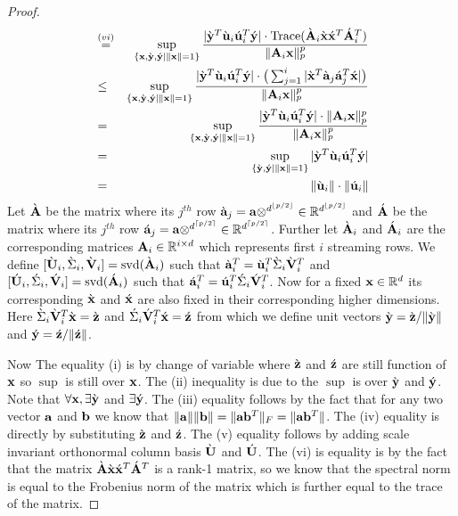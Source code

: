 \begin{proof}{\label{proof:slowOnlineSensitivityBound}}
\begin{eqnarray*}
  &\stackrel{(vi)}=& \sup_{\{\mathbf{x},\grave{\mathbf{y}},\acute{\mathbf{y}}\mid\|\mathbf{x}\|=1\}}\frac{|\grave{\mathbf{y}}^{T}\grave{\mathbf{u}}_{i}\acute{\mathbf{u}}_{i}^{T}\acute{\mathbf{y}}|\cdot\mbox{Trace}(\grave{\mathbf{A}}_{i}\grave{\mathbf{x}}\acute{\mathbf{x}}^{T}\acute{\mathbf{A}}_{i}^{T})}{\|\mathbf{A}_{i}\mathbf{x}\|_{p}^{p}} \\
  &\leq& \sup_{\{\mathbf{x},\grave{\mathbf{y}},\acute{\mathbf{y}}\mid\|\mathbf{x}\|=1\}}\frac{|\grave{\mathbf{y}}^{T}\grave{\mathbf{u}}_{i}\acute{\mathbf{u}}_{i}^{T}\acute{\mathbf{y}}|\cdot\big(\sum_{j=1}^{i}|\grave{\mathbf{x}}^{T}\grave{\mathbf{a}}_{j}\acute{\mathbf{a}}_{j}^{T}\acute{\mathbf{x}}|\big)}{\|\mathbf{A}_{i}\mathbf{x}\|_{p}^{p}} \\
  &=& \sup_{\{\mathbf{x},\grave{\mathbf{y}},\acute{\mathbf{y}}\mid\|\mathbf{x}\|=1\}}\frac{|\grave{\mathbf{y}}^{T}\grave{\mathbf{u}}_{i}\acute{\mathbf{u}}_{i}^{T}\acute{\mathbf{y}}|\cdot\|\mathbf{A}_{i}\mathbf{x}\|_{p}^{p}}{\|\mathbf{A}_{i}\mathbf{x}\|_{p}^{p}} \\
  &=& \sup_{\{\grave{\mathbf{y}},\acute{\mathbf{y}}\mid\|\mathbf{x}\|=1\}}|\grave{\mathbf{y}}^{T}\grave{\mathbf{u}}_{i}\acute{\mathbf{u}}_{i}^{T}\acute{\mathbf{y}}| \\
  &=& \|\grave{\mathbf{u}}_{i}\|\cdot\|\acute{\mathbf{u}}_{i}\|
 \end{eqnarray*}
 Let $\grave{\mathbf{A}}$ be the matrix where its $j^{th}$ row $\grave{\mathbf{a}}_{j} = \mathbf{a} \otimes^{d^{\lfloor p/2 \rfloor}} \in \mathbb{R}^{d^{\lfloor p/2 \rfloor}}$ and $\acute{\mathbf{A}}$ be the matrix where its $j^{th}$ row $\acute{\mathbf{a}}_{j} = \mathbf{a} \otimes^{d^{\lceil p/2 \rceil}} \in \mathbb{R}^{d^{\lceil p/2 \rceil}}$. Further let $\grave{\mathbf{A}}_{i}$ and $\acute{\mathbf{A}}_{i}$ are the corresponding matrices $\mathbf{A}_{i} \in \mathbb{R}^{i \times d}$ which represents first $i$ streaming rows. We define $[\grave{\mathbf{U}}_{i},\grave{\Sigma}_{i},\grave{\mathbf{V}}_{i}] = \mbox{svd}(\grave{\mathbf{A}}_{i})$ such that $\grave{\mathbf{a}}_{i}^{T} = \grave{\mathbf{u}}_{i}^{T}\grave{\Sigma}_{i}\grave{\mathbf{V}}_{i}^{T}$ and $[\acute{\mathbf{U}}_{i},\acute{\Sigma}_{i},\acute{\mathbf{V}}_{i}] = \mbox{svd}(\acute{\mathbf{A}}_{i})$ such that $\acute{\mathbf{a}}_{i}^{T} = \acute{\mathbf{u}}_{i}^{T}\acute{\Sigma}_{i}\acute{\mathbf{V}}_{i}^{T}$. Now for a fixed $\mathbf{x} \in \mathbb{R}^{d}$ its corresponding $\grave{\mathbf{x}}$ and $\acute{\mathbf{x}}$ are also fixed in their corresponding higher dimensions. Here $\grave{\Sigma}_{i}\grave{\mathbf{V}}_{i}^{T}\grave{\mathbf{x}}=\grave{\mathbf{z}}$ and $\acute{\Sigma}_{i}\acute{\mathbf{V}}_{i}^{T}\acute{\mathbf{x}}=\acute{\mathbf{z}}$ from which we define unit vectors $\grave{\mathbf{y}} = \grave{\mathbf{z}}/\|\grave{\mathbf{y}}\|$ and $\acute{\mathbf{y}} = \acute{\mathbf{z}}/\|\acute{\mathbf{z}}\|$.

 Now The equality (i) is by change of variable where $\grave{\mathbf{z}}$ and $\acute{\mathbf{z}}$ are still function of $\mathbf{x}$ so $\sup$ is still over $\mathbf{x}$. The (ii) inequality is due to the $\sup$ is over $\grave{\mathbf{y}}$ and $\acute{\mathbf{y}}$. Note that $\forall \mathbf{x}, \exists \grave{\mathbf{y}}$ and $\exists \acute{\mathbf{y}}$. The (iii) equality follows by the fact that for any two vector $\mathbf{a}$ and $\mathbf{b}$ we know that $\|\mathbf{a}\|\|\mathbf{b}\| = \|\mathbf{a}\mathbf{b}^{T}\|_{F} = \|\mathbf{a}\mathbf{b}^{T}\|$. The (iv) equality is directly by substituting $\grave{\mathbf{z}}$ and $\acute{\mathbf{z}}$. The (v) equality follows by adding scale invariant orthonormal column basis $\grave{\mathbf{U}}$ and $\acute{\mathbf{U}}$. The (vi) is equality is by the fact that the matrix $\grave{\mathbf{A}}\grave{\mathbf{x}}\acute{\mathbf{x}}^{T}\acute{\mathbf{A}}^{T}$ is a rank-1 matrix, so we know that the spectral norm is equal to the Frobenius norm of the matrix which is further equal to the trace of the matrix. 


\end{proof}
